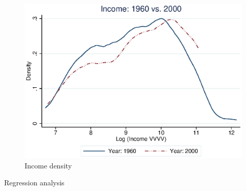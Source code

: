 \documentclass[a4paper,12pt]{article}
\begin{document}
\begin{figure}[ht]
	\begin{center}
		\includegraphics[scale = 1.0,trim = 0.0 0.0 0.0 0.0,clip]{income_density.eps}
		\caption{Income density}\label{fig:incdensity}
	\end{center}
\end{figure}

\begin{table}[ht]
\caption{Regression analysis}\label{tb:regresults}
	\begin{center}
		
	\end{center}
\end{table}


\end{document}

